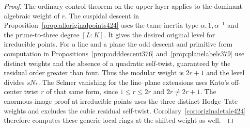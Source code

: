 \documentclass[a4paper,11pt]{article}
\theoremstyle{definition}
\theoremstyle{remark}
\numberwithin{equation}{section}
\begin{document}
\begin{proof}
The ordinary control theorem on the upper layer applies to
the dominant algebraic weight of \(r\). The cuspidal descent
in Proposition~\ref{prop:alloriginalpoints424} uses the tame
inertia type \(\alpha,1,\alpha^{-1}\) and the prime-to-three
degree \([L:K]\). It gives the desired original level for
irreducible points. For a line and a plane the odd descent
and primitive form computation in Propositions~\ref{prop:odddescent376}
and~\ref{prop:planelabels379} use distinct weights and the
absence of a quadratic self-twist, guaranteed by the residual
order greater than four. Thus the modular weight is \(2r+1\)
and the level divides \(sN_*\). The Selmer vanishing for the
line--plane extensions uses Kato's off-center twist \(r\)
of that same form, since \(1\le r\le 2r\) and \(2r\ne2r+1\).
The enormous-image proof at irreducible points uses the
three distinct Hodge--Tate weights and excludes the cubic
residual self-twist. Corollary~\ref{cor:originaletale424}
therefore computes these generic local rings at the shifted
weight as well.~\cite{XI-VIII-VI-kato120,XI-VIII-VI-nt119}
\end{proof}
\end{document}
